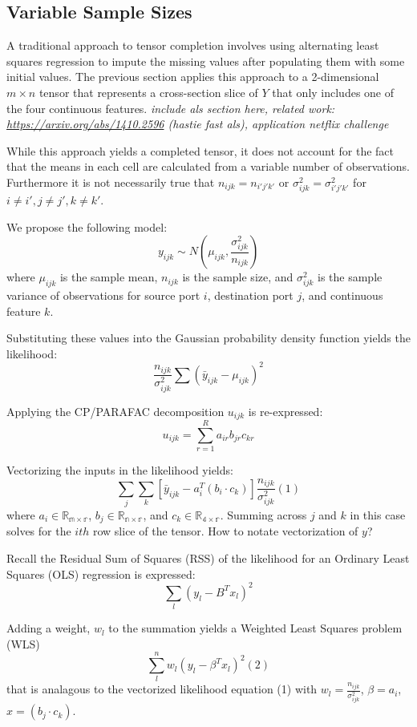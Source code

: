\documentclass[12pt,twoside]{dukestatscithesis}
\theoremstyle{definition}
\theoremstyle{definition}
\theoremstyle{definition}
\theoremstyle{remark}
\begin{document}
\subsection{Variable Sample Sizes}\label{variable-sample-sizes}

A traditional approach to tensor completion involves using alternating
least squares regression to impute the missing values after populating
them with some initial values. The previous section applies this
approach to a 2-dimensional \(m \times n\) tensor that represents a
cross-section slice of \(Y\) that only includes one of the four
continuous features. \emph{include als section here, related work:
\url{https://arxiv.org/abs/1410.2596} (hastie fast als), application
netflix challenge}

While this approach yields a completed tensor, it does not account for
the fact that the means in each cell are calculated from a variable
number of observations. Furthermore it is not necessarily true that
\(n_{ijk} = n_{i'j'k'}\) or \(\sigma^2_{ijk} = \sigma^2_{i'j'k'}\) for
\(i \neq i', j \neq j', k \neq k'\).

We propose the following model:
\[y_{ijk} \sim N(\mu_{ijk}, \frac{\sigma^2_{ijk}}{n_{ijk}})\] where
\(\mu_{ijk}\) is the sample mean, \(n_{ijk}\) is the sample size, and
\(\sigma^2_{ijk}\) is the sample variance of observations for source
port \(i\), destination port \(j\), and continuous feature \(k\).

Substituting these values into the Gaussian probability density function
yields the likelihood:
\[\frac{n_{ijk}}{\sigma^2_{ijk}}\sum(\bar y_{ijk} - \mu_{ijk})^2\]

Applying the CP/PARAFAC decomposition \(u_{ijk}\) is re-expressed:
\[u_{ijk} = \sum_{r=1}^Ra_{ir}b_{jr}c_{kr}\]

Vectorizing the inputs in the likelihood yields:
\[\sum_j\sum_k[\bar y_{ijk} - a_i^T(b_i \cdotp c_k)]\frac{n_{ijk}}{\sigma^2_{ijk}} (1)\]
where \(a_i \in \mathbb{R_{m \times r}}\),
\(b_j \in \mathbb{R_{n \times r}}\), and
\(c_k \in \mathbb{R_{4 \times r}}\). Summing across \(j\) and \(k\) in
this case solves for the \(ith\) row slice of the tensor. How to notate
vectorization of \(y\)?

Recall the Residual Sum of Squares (RSS) of the likelihood for an
Ordinary Least Squares (OLS) regression is expressed:
\[\sum_l(y_l-B^Tx_l)^2\]

Adding a weight, \(w_l\) to the summation yields a Weighted Least
Squares problem (WLS) \[\sum_l^nw_l(y_l-\beta^Tx_l)^2 (2)\] that is
analagous to the vectorized likelihood equation (1) with
\(w_l = \frac{n_{ijk}}{\sigma^2_{ijk}}\), \(\beta = a_i\),
\(x = (b_j \cdotp c_k)\).
\end{document}
